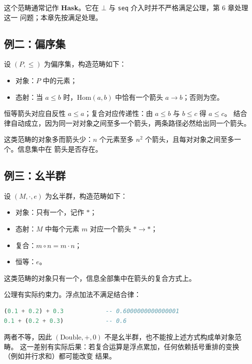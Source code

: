 这个范畴通常记作 \textbf{Hask}。它在 \(\bot\) 与 \passthrough{\lstinline!seq!} 介入时并不严格满足公理，第 6 章处理这一
问题；本章先按满足处理。

\subsection{例二：偏序集}\label{ux4f8bux4e8cux504fux5e8fux96c6}

设 \((P, \leq)\) 为偏序集，构造范畴如下：

\begin{itemize}
\tightlist
\item
  对象：\(P\) 中的元素；
\item
  态射：当 \(a \leq b\) 时，\(\mathrm{Hom}(a, b)\) 中恰有一个箭头 \(a \to b\)；否则为空。
\end{itemize}

恒等箭头对应自反性 \(a \leq a\)；复合对应传递性：由 \(a \leq b\) 与 \(b \leq c\) 得 \(a \leq c\)。
结合律自动成立，因为同一对对象之间至多一个箭头，两条路径必然给出同一个箭头。

这类范畴的对象多而箭头少：\(n\) 个元素至多 \(n^2\) 个箭头，且每对对象之间至多一个。信息集中在
箭头是否存在。

\subsection{例三：幺半群}\label{ux4f8bux4e09ux5e7aux534aux7fa4}

设 \((M, \cdot, e)\) 为幺半群，构造范畴如下：

\begin{itemize}
\tightlist
\item
  对象：只有一个，记作 \(\ast\)；
\item
  态射：\(M\) 中每个元素 \(m\) 对应一个箭头 \(\ast \to \ast\)；
\item
  复合：\(m \circ n = m \cdot n\)；
\item
  恒等：\(e\)。
\end{itemize}

这类范畴的对象只有一个，信息全部集中在箭头的复合方式上。

公理有实际约束力。浮点加法不满足结合律：

\begin{lstlisting}[language=Haskell]
(0.1 + 0.2) + 0.3            -- 0.6000000000000001
0.1 + (0.2 + 0.3)            -- 0.6
\end{lstlisting}

两者不等，因此 \((\mathrm{Double}, +, 0)\) 不是幺半群，也不能按上述方式构成单对象范畴。
这一差别有实际后果：若复合运算是浮点累加，任何依赖括号重排的变换（例如并行求和）都可能改变
结果。

